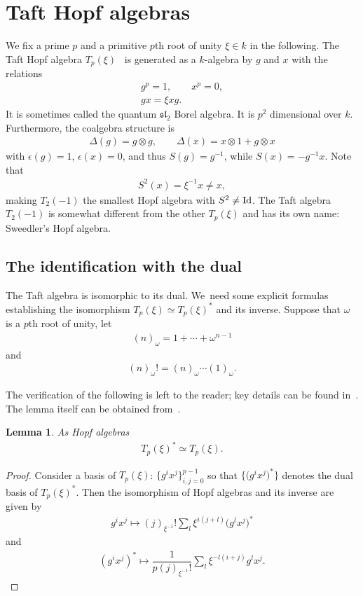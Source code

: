 \documentclass[10pt,a4paper]{amsart}
\numberwithin{equation}{section}
\newtheorem{Lemma}[Theorem]{Lemma}
\newcommand{\ot}{\otimes}
\begin{document}
\section{Taft Hopf algebras}\label{sec:blah}
We fix a prime $p$ and a primitive $p$th root of unity $\xi\in k$ in the following. The Taft Hopf algebra $T_p(\xi)$~\cite{taft} is generated as a $k$-algebra by $g$ and $x$ with the relations \begin{gather}
g^p=1,\qquad
x^p=0,
\\
gx=\xi xg.
\end{gather}
It is sometimes called the quantum ${\mathfrak{sl}}_2$ Borel algebra. It is $p^2$ dimensional over $k$. Furthermore, the coalgebra structure is
\begin{gather}
\Delta(g)=g\ot g,\qquad \Delta(x)=x\ot 1+g\ot x
\end{gather}
with $\epsilon(g)=1$, $\epsilon(x)=0$, and thus $S(g)=g^{-1}$, while $S(x)=-g^{-1}x$. Note that
\begin{gather}
S^2(x)=\xi^{-1}x\neq x,
\end{gather}
making $T_2(-1)$ the smallest Hopf algebra with $S^2\neq {\rm Id}$. The Taft algebra $T_2(-1)$ is somewhat different from the other $T_p(\xi)$ and has its own name: Sweedler’s Hopf algebra.

\subsection{The identification with the dual}
The Taft algebra is isomorphic to its dual. We~need some explicit formulas establishing the isomorphism $T_p(\xi)\simeq T_p(\xi)^*$ and its inverse. Suppose that $\omega$ is a $p$th root of unity, let
\begin{gather}
(n)_\omega=1+\cdots +\omega^{n-1}
\end{gather}
and
\begin{gather}
(n)_\omega !=(n)_\omega\cdots(1)_\omega.
\end{gather}

The verification of the following is left to the reader; key details can be found in~\cite{selfdual}. The lemma itself can be obtained from~\cite{nen}.
\begin{Lemma}\label{nenlem}
 As Hopf algebras
 \begin{gather}
 T_p(\xi)^*\simeq T_p(\xi).
 \end{gather}
\end{Lemma}
\begin{proof}
Consider a basis of $T_p(\xi)$: $\big\{g^ix^j\big\}_{ i,j=0}^{p-1}$ so that $\big\{\big(g^ix^j\big)^*\big\}$ denotes the dual basis of $T_p(\xi)^*$. Then the isomorphism of Hopf algebras and its inverse are given by
\begin{gather}
g^ix^j\mapsto(j)_{\xi^{-1}}!\sum_l\xi^{i(j+l)}\big(g^lx^j\big)^*
\end{gather}
and
\begin{gather}
(g^ix^j)^*\mapsto\dfrac{1}{p(j)_{\xi^{-1}}!}\sum_l\xi^{-l(i+j)}g^lx^j.
\end{gather}
\end{proof}
\end{document}
